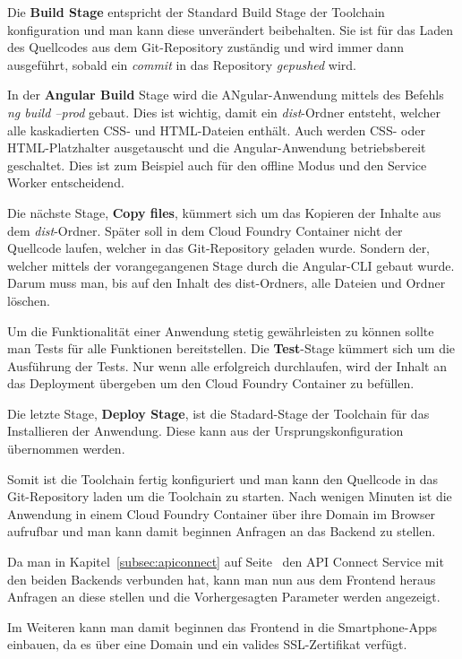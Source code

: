 Die \textbf{Build Stage} entspricht der Standard Build Stage der Toolchain konfiguration und man kann diese unverändert
beibehalten. Sie ist für das Laden des Quellcodes aus dem Git-Repository zuständig und wird immer dann ausgeführt,
sobald ein \textit{commit} in das Repository \textit{gepushed} wird.

In der \textbf{Angular Build} Stage wird die ANgular-Anwendung mittels des Befehls \textit{ng build --prod} gebaut. Dies
ist wichtig, damit ein \textit{dist}-Ordner entsteht, welcher alle kaskadierten CSS- und HTML-Dateien enthält. Auch
werden CSS- oder HTML-Platzhalter ausgetauscht und die Angular-Anwendung betriebsbereit geschaltet. Dies ist zum
Beispiel auch für den offline Modus und den Service Worker entscheidend.

Die nächste Stage, \textbf{Copy files}, kümmert sich um das Kopieren der Inhalte aus dem \textit{dist}-Ordner. Später
soll in dem Cloud Foundry Container nicht der Quellcode laufen, welcher in das Git-Repository geladen wurde. Sondern
der, welcher mittels der vorangegangenen Stage durch die Angular-CLI gebaut wurde. Darum muss man, bis auf den Inhalt
des dist-Ordners, alle Dateien und Ordner löschen.

Um die Funktionalität einer Anwendung stetig gewährleisten zu können sollte man Tests für alle Funktionen bereitstellen.
Die \textbf{Test}-Stage kümmert sich um die Ausführung der Tests. Nur wenn alle erfolgreich durchlaufen, wird der Inhalt
an das Deployment übergeben um den Cloud Foundry Container zu befüllen.

Die letzte Stage, \textbf{Deploy Stage}, ist die Stadard-Stage der Toolchain für das Installieren der Anwendung. Diese
kann aus der Ursprungskonfiguration übernommen werden.

Somit ist die Toolchain fertig konfiguriert und man kann den Quellcode in das Git-Repository laden um die Toolchain zu
starten. Nach wenigen Minuten ist die Anwendung in einem Cloud Foundry Container über ihre Domain im Browser aufrufbar
und man kann damit beginnen Anfragen an das Backend zu stellen.

Da man in Kapitel~\ref{subsec:apiconnect} auf Seite~\pageref{subsec:apiconnect} den API Connect Service mit den beiden
Backends verbunden hat, kann man nun aus dem Frontend heraus Anfragen an diese stellen und die Vorhergesagten Parameter
werden angezeigt.

Im Weiteren kann man damit beginnen das Frontend in die Smartphone-Apps einbauen, da es über eine Domain und ein
valides SSL-Zertifikat verfügt.

